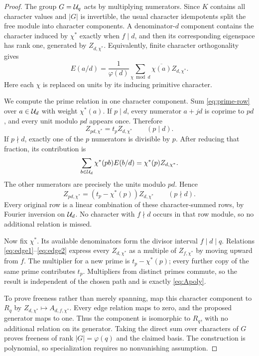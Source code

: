 \documentclass[11pt]{article}
\numberwithin{equation}{section}
\theoremstyle{definition}\newtheorem{definition}[theorem]{Definition}
\theoremstyle{remark}\newtheorem{remark}[theorem]{Remark}
\newcommand{\ch}{\chi^*}
\begin{document}
\begin{proof}
The group $G=\mathcal U_q$ acts by multiplying numerators. Since $K$ contains all
character values and $|G|$ is invertible, the usual character idempotents
split the free module into character components. A denominator-$d$
component contains the character induced by $\ch$ exactly when $f\mid d$,
and then its corresponding eigenspace has rank one, generated by
$Z_{d,\ch}$. Equivalently, finite character orthogonality gives
\begin{equation}\label{eq:inversefourier}
E(a/d)=\frac1{\varphi(d)}
\sum_{\chi\bmod d}\overline{\chi(a)}Z_{d,\chi^*}.
\end{equation}
Here each $\chi$ is replaced on units by its inducing primitive character.

We compute the prime relation in one character component. Sum
\eqref{eq:prime-row} over $a\in\mathcal U_d$ with weight $\ch(a)$.
If $p\mid d$, every numerator $a+jd$ is coprime to $pd$, and every unit
modulo $pd$ appears once. Therefore
\begin{equation}\label{eq:edge1}
Z_{pd,\ch}=t_pZ_{d,\ch}\qquad(p\mid d).
\end{equation}
If $p\nmid d$, exactly one of the $p$ numerators is divisible by $p$.
After reducing that fraction, its contribution is
\[
\sum_{b\in\U_d}\ch(pb)E(b/d)=\ch(p)Z_{d,\ch}.
\]
The other numerators are precisely the units modulo $pd$. Hence
\begin{equation}\label{eq:edge2}
Z_{pd,\ch}=(t_p-\ch(p))Z_{d,\ch}\qquad(p\nmid d).
\end{equation}
Every original row is a linear combination of these character-summed rows,
by Fourier inversion on $\mathcal U_d$. No character with $f\nmid d$ occurs in
that row module, so no additional relation is missed.

Now fix $\ch$. Its available denominators form the divisor interval
$f\mid d\mid q$. Relations \eqref{eq:edge1}--\eqref{eq:edge2} express every
$Z_{d,\ch}$ as a multiple of $Z_{f,\ch}$ by moving upward from $f$.
The multiplier for a new prime is $t_p-\ch(p)$; every further copy of the
same prime contributes $t_p$. Multipliers from distinct primes commute,
so the result is independent of the chosen path and is exactly
\eqref{eq:Apoly}.

To prove freeness rather than merely spanning, map this character component
to $R_q$ by $Z_{d,\ch}\mapsto A_{d,f,\ch}$. Every edge relation maps to
zero, and the proposed generator maps to one. Thus the component is
isomorphic to $R_q$, with no additional relation on its generator.
Taking the direct sum over characters of $G$ proves freeness of rank
$|G|=\varphi(q)$ and the claimed basis. The construction is polynomial,
so specialization requires no nonvanishing assumption.
\end{proof}
\end{document}
